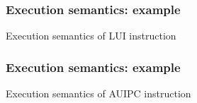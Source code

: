 
\begin{frame}
\frametitle{Execution semantics: example}

Execution semantics of LUI instruction

\vspace{1ex}

\begin{center}
\end{center}

\end{frame}


\begin{frame}
\frametitle{Execution semantics: example}

Execution semantics of AUIPC instruction

\vspace{1ex}

\begin{center}
\end{center}

\end{frame}


